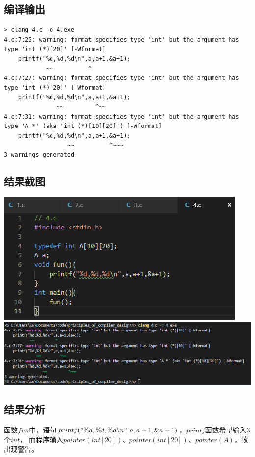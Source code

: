 \documentclass[UTF8]{ctexart}
\begin{document}
\subsection{编译输出}
\begin{lstlisting}
> clang 4.c -o 4.exe
4.c:7:25: warning: format specifies type 'int' but the argument has type 'int (*)[20]' [-Wformat]
    printf("%d,%d,%d\n",a,a+1,&a+1);
            ~~          ^
4.c:7:27: warning: format specifies type 'int' but the argument has type 'int (*)[20]' [-Wformat]
    printf("%d,%d,%d\n",a,a+1,&a+1);
               ~~         ^~~
4.c:7:31: warning: format specifies type 'int' but the argument has type 'A *' (aka 'int (*)[10][20]') [-Wformat]
    printf("%d,%d,%d\n",a,a+1,&a+1);
                  ~~          ^~~~
3 warnings generated.
    \end{lstlisting}
\subsection{结果截图}
\includegraphics{4-code} \\
\includegraphics[width=\textwidth]{4-output}
\subsection{结果分析}
函数$fun$中，语句$printf("\%d,\%d,\%d \backslash n",a,a+1,\&a+1)$，$printf$函数希望输入$3$个$int$，
而程序输入$pointer(int[20])$、$pointer(int[20])$、$pointer(A)$，故出现警告。
\end{document}

